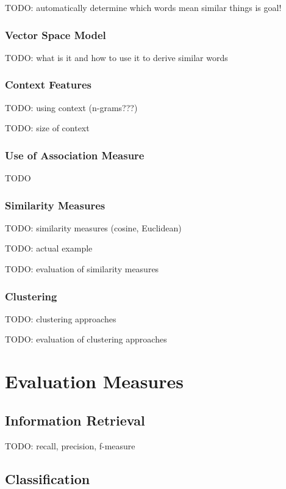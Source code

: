 \documentclass{article}
\begin{document}
TODO: automatically determine which words mean similar things is goal!

\subsubsection{Vector Space Model}

TODO: what is it and how to use it to derive similar words

\subsubsection{Context Features}

TODO: using context (n-grams???)

TODO: size of context

\subsubsection{Use of Association Measure}

TODO

\subsubsection{Similarity Measures}

TODO: similarity measures (cosine, Euclidean)

TODO: actual example

TODO: evaluation of similarity measures

\subsubsection{Clustering}

TODO: clustering approaches

TODO: evaluation of clustering approaches

\section{Evaluation Measures}

\subsection{Information Retrieval}
\label{sec:ir-evaluation}

TODO: recall, precision, f-measure

\subsection{Classification}
\end{document}
